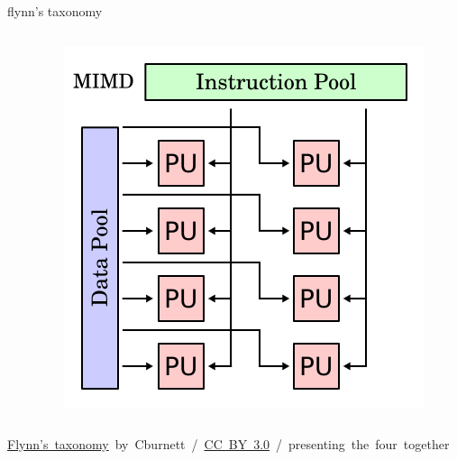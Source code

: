 \documentclass[10pt, t]{beamer}
\begin{document}
\begin{frame}{flynn's taxonomy}
\begin{columns}
\begin{column}{.27\textwidth}
      \end{column}
      \begin{column}{.27\textwidth}
        \centering
        \includegraphics[width=\textwidth]{MIMD.png}
      \end{column}
    \end{columns}
    \hfill \tiny{\href{https://en.wikipedia.org/wiki/Flynn's\_taxonomy}{Flynn's~taxonomy}~by~Cburnett~/~\href{http://creativecommons.org/licenses/by-sa/3.0}{CC~BY~3.0}~/~presenting~the~four~together}


\end{frame}
\end{document}

